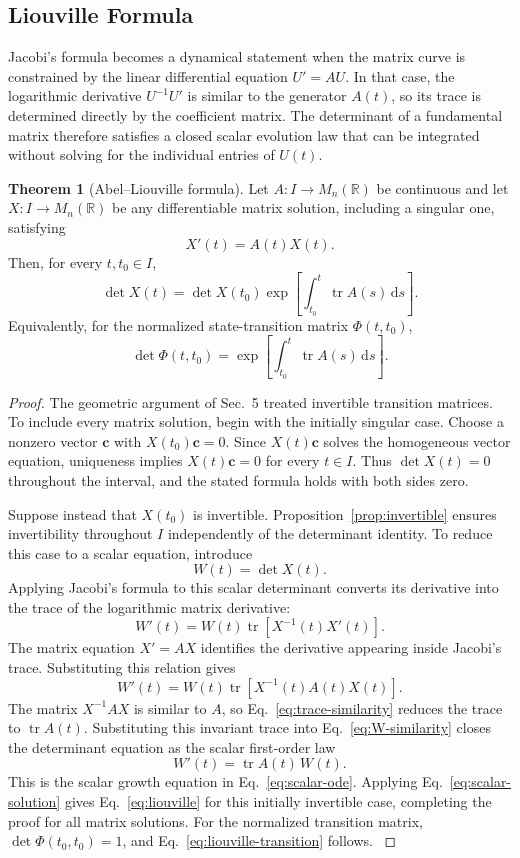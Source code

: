 \documentclass[11pt,a4paper]{article}
\newcommand{\be}{\begin{equation}}
\newcommand{\ee}{\end{equation}}
\newcommand{\lb}[1]{\label{#1}}
\newcommand{\dd}{\mathrm{d}}
\newcommand{\R}{\mathbb{R}}
\DeclareMathOperator{\tr}{tr}
\theoremstyle{definition}
\newtheorem{theorem}{Theorem}[section]
\numberwithin{equation}{section}
\begin{document}
\subsection{Liouville Formula}

Jacobi's formula becomes a dynamical statement when the matrix curve is constrained by the linear differential equation $U'=AU$. In that case, the logarithmic derivative $U^{-1}U'$ is similar to the generator $A(t)$, so its trace is determined directly by the coefficient matrix. The determinant of a fundamental matrix therefore satisfies a closed scalar evolution law that can be integrated without solving for the individual entries of $U(t)$.

\begin{theorem}[Abel--Liouville formula]
Let $A:I\rightarrow M_n(\R)$ be continuous and let $X:I\rightarrow M_n(\R)$ be any differentiable matrix solution, including a singular one, satisfying
\be
X'(t)=A(t)X(t).
\lb{eq:liouville-matrix-ode}
\ee
Then, for every $t,t_0\in I$,
\be
\det X(t)
=
\det X(t_0)
\exp\left[
\int_{t_0}^{t}\tr A(s)\,\dd s
\right].
\lb{eq:liouville}
\ee
Equivalently, for the normalized state-transition matrix $\Phi(t,t_0)$,
\be
\det\Phi(t,t_0)
=
\exp\left[
\int_{t_0}^{t}\tr A(s)\,\dd s
\right].
\lb{eq:liouville-transition}
\ee
\end{theorem}

\begin{proof}
The geometric argument of Sec.~5 treated invertible transition matrices. To include every matrix solution, begin with the initially singular case. Choose a nonzero vector $\mathbf c$ with $X(t_0)\mathbf c=0$. Since $X(t)\mathbf c$ solves the homogeneous vector equation, uniqueness implies $X(t)\mathbf c=0$ for every $t\in I$. Thus $\det X(t)=0$ throughout the interval, and the stated formula holds with both sides zero.

Suppose instead that $X(t_0)$ is invertible. Proposition~\ref{prop:invertible} ensures invertibility throughout $I$ independently of the determinant identity. To reduce this case to a scalar equation, introduce
\be
W(t)=\det X(t).
\lb{eq:W-definition}
\ee
Applying Jacobi's formula to this scalar determinant converts its derivative into the trace of the logarithmic matrix derivative:
\be
W'(t)
=
W(t)\tr\left[X^{-1}(t)X'(t)\right].
\lb{eq:W-jacobi}
\ee
The matrix equation $X'=AX$ identifies the derivative appearing inside Jacobi's trace. Substituting this relation gives
\be
W'(t)
=
W(t)\tr\left[X^{-1}(t)A(t)X(t)\right].
\lb{eq:W-similarity}
\ee
The matrix $X^{-1}AX$ is similar to $A$, so Eq.~\eqref{eq:trace-similarity} reduces the trace to $\tr A(t)$. Substituting this invariant trace into Eq.~\eqref{eq:W-similarity} closes the determinant equation as the scalar first-order law
\be
W'(t)=\tr A(t)\,W(t).
\lb{eq:W-scalar}
\ee
This is the scalar growth equation in Eq.~\eqref{eq:scalar-ode}. Applying Eq.~\eqref{eq:scalar-solution} gives Eq.~\eqref{eq:liouville} for this initially invertible case, completing the proof for all matrix solutions. For the normalized transition matrix, $\det\Phi(t_0,t_0)=1$, and Eq.~\eqref{eq:liouville-transition} follows. \cite{coddington1955,hartman2002,teschl2012}
\end{proof}
\end{document}
